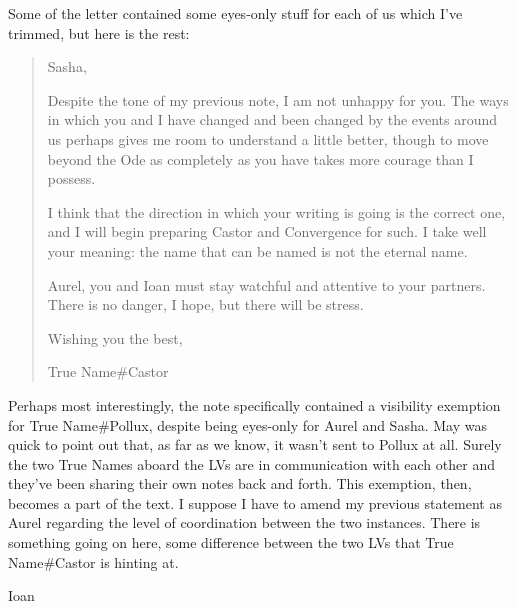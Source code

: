 Some of the letter contained some eyes-only stuff for each of us which I've trimmed, but here is the rest:

\begin{quote}
Sasha,

Despite the tone of my previous note, I am not unhappy for you. The ways in which you and I have changed and been changed by the events around us perhaps gives me room to understand a little better, though to move beyond the Ode as completely as you have takes more courage than I possess.

I think that the direction in which your writing is going is the correct one, and I will begin preparing Castor and Convergence for such. I take well your meaning: the name that can be named is not the eternal name.

Aurel, you and Ioan must stay watchful and attentive to your partners. There is no danger, I hope, but there will be stress.

Wishing you the best,

True Name\#Castor
\end{quote}

Perhaps most interestingly, the note specifically contained a visibility exemption for True Name\#Pollux, despite being eyes-only for Aurel and Sasha. May was quick to point out that, as far as we know, it wasn't sent to Pollux at all. Surely the two True Names aboard the LVs are in communication with each other and they've been sharing their own notes back and forth. This exemption, then, becomes a part of the text. I suppose I have to amend my previous statement as Aurel regarding the level of coordination between the two instances. There is something going on here, some difference between the two LVs that True Name\#Castor is hinting at.

Ioan
